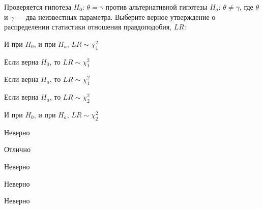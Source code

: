 
\begin{question}
Проверяется гипотеза \(H_0\): \(\theta = \gamma\) против альтернативной
гипотезы \(H_a\): \(\theta \neq \gamma\), где \(\theta\) и \(\gamma\)
--- два неизвестных параметра. Выберите верное утверждение о
распределении статистики отношения правдоподобия, \(LR\):
\begin{answerlist}
  \item И при \(H_0\), и при \(H_a\), \(LR \sim \chi_1^2\)
  \item Если верна \(H_0\), то \(LR \sim \chi_1^2\)
  \item Если верна \(H_a\), то \(LR \sim \chi_1^2\)
  \item Если верна \(H_a\), то \(LR \sim \chi_2^2\)
  \item И при \(H_0\), и при \(H_a\), \(LR \sim \chi_2^2\)
\end{answerlist}
\end{question}

\begin{solution}
\begin{answerlist}
  \item Неверно
  \item Отлично
  \item Неверно
  \item Неверно
  \item Неверно
\end{answerlist}
\end{solution}

